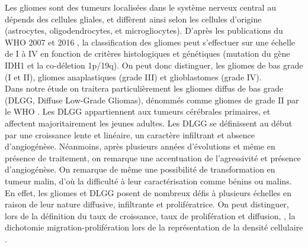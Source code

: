 \documentclass[12pt,a4paper]{article}
\begin{document}
Les gliomes sont des tumeurs localisées dans le système nerveux central au dépends des cellules gliales, et diffèrent ainsi selon les cellules d’origine (astrocytes, oligodendrocytes, et microgliocytes). D’après les publications du WHO 2007 et 2016 \cite{d} \cite{e} , la classification des gliomes peut s’effectuer sur une échelle de I à IV en fonction de critères histologiques et génétiques (mutation du gène IDH1 et la co-déletion 1p/19q). On peut donc distinguer, les gliomes de bas grade (I et II), gliomes anaplastiques  (grade III) et glioblastomes (grade IV).\\
Dans notre étude on traitera particulièrement les gliomes diffus de bas grade (DLGG, Diffuse Low-Grade Gliomas), dénommés comme gliomes de grade II par le WHO \cite{d} \cite{e}.  
Les DLGG appartiennent aux tumeurs cérébrales primaires, et affectent majoritairement les jeunes adultes. Les DLGG se définissent au début par une croissance lente et linéaire, un caractère infiltrant et absence d’angiogénèse. Néanmoins, après plusieurs années d’évolutions et même en présence de traitement, on remarque une accentuation de l’agressivité et présence d’angiogénèse. On remarque de même une possibilité de transformation en tumeur malin, d’où la difficulté à leur caractérisation comme bénins ou malins. En effet, les gliomes et DLGG posent de nombreux défis à plusieurs échelles en raison de leur nature diffusive, infiltrante et prolifératrice. On peut distinguer, lors de la définition du taux de croissance, taux de prolifération et diffusion, \cite{f} , la dichotomie migration-prolifération lors de la représentation de la densité cellulaire \cite{g} .  
\end{document}

